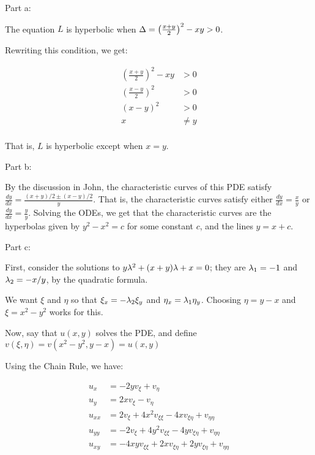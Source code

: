 \documentclass[a4paper,12pt]{article}
\begin{document}
Part a:

The equation $L$ is hyperbolic when $\Delta = \left(\frac{x+y}{2}\right)^2 - xy >0$. 

Rewriting this condition, we get:

\begin{align*}
\left(\frac{x+y}{2}\right)^2 - xy &>0\\
\left(\frac{x-y}{2}\right)^2&>0\\
\left(x-y\right)^2&>0\\
x &\neq y\\
\end{align*}

That is, $L$ is hyperbolic except when $x=y$. 

\shunt

Part b:

By the discussion in John, the characteristic curves of this PDE satisfy $\frac{dy}{dx} = \frac{(x+y)/2 \pm (x-y)/2}{y}$. That is, the characteristic curves satisfy either $\frac{dy}{dx} = \frac{x}{y}$ or $\frac{dy}{dx} = \frac{y}{y}$. Solving the ODEs, we get that the characteristic curves are the hyperbolas given by $y^2-x^2 = c$ for some constant $c$, and the lines $y= x + c$. %

\shunt

Part c:

First, consider the solutions to $y\lambda^2 + (x+y)\lambda + x = 0$; they are $\lambda_1=-1$ and $\lambda_2 = -x/y$, by the quadratic formula.

We want $\xi$ and $\eta$ so that $\xi_x = -\lambda_2 \xi_y$ and $\eta_x = \lambda_1 \eta_y$. Choosing $\eta=y-x$ and $\xi=x^2-y^2$ works for this.

Now, say that $u(x,y)$ solves the PDE, and define $v(\xi,\eta) = v(x^2-y^2,y-x) = u(x,y)$


Using the Chain Rule, we have:

\begin{align*}
u_x &= -2yv_\xi + v_\eta\\
u_y &= 2xv_\xi -v_\eta\\
u_{xx} &= 2v_\xi + 4x^2v_{\xi\xi} -4x v_{\xi\eta} + v_{\eta\eta} \\
u_{yy} &= -2v_\xi + 4y^2v_{\xi\xi} -4yv_{\xi\eta} + v_{\eta \eta}\\
u_{xy} &= -4xyv_{\xi\xi} + 2xv_{\xi\eta} + 2yv_{\xi\eta} +v_{\eta\eta}\\
\end{align*}
\end{document}
